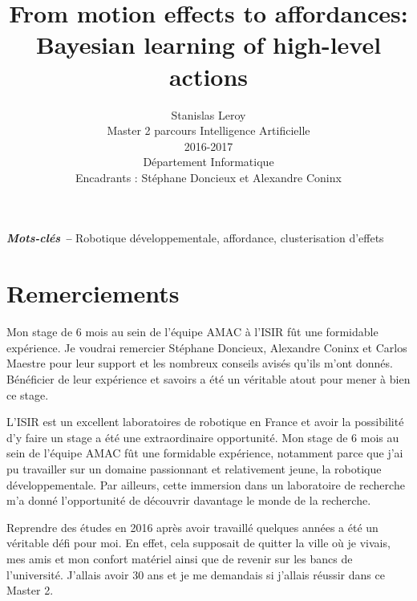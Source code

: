 \documentclass{llncs}
\providecommand{\keywords}[1]{\textbf{\textit{Mots-clés --}} #1}
\begin{document}
\title{From motion effects to affordances: Bayesian learning of high-level actions}

\author{Stanislas Leroy\\
   Master 2 parcours Intelligence Artificielle\\
   2016-2017\\
   Département Informatique\\
   Encadrants : Stéphane Doncieux et Alexandre Coninx}

\maketitle

\keywords{Robotique développementale, affordance, clusterisation d'effets}






\section*{Remerciements}

Mon stage de 6 mois au sein de l'équipe AMAC à l'ISIR fût une formidable expérience. Je voudrai remercier Stéphane Doncieux, Alexandre Coninx et Carlos Maestre pour leur support et les nombreux conseils avisés qu'ils m'ont donnés.
Bénéficier de leur expérience et savoirs a été un véritable atout pour mener à bien ce stage.

L'ISIR est un excellent laboratoires de robotique en France et avoir la possibilité d'y faire un stage a été une extraordinaire opportunité. Mon stage de 6 mois au sein de l'équipe AMAC fût une formidable expérience, notamment parce que j'ai pu travailler sur un domaine passionnant et relativement jeune, la robotique développementale. Par ailleurs,  cette immersion dans un laboratoire de recherche m'a donné l'opportunité de découvrir davantage le monde de la recherche.

Reprendre des études en 2016 après avoir travaillé quelques années a été un véritable défi pour moi. En effet, cela supposait de quitter la ville où je vivais, mes amis et mon confort matériel ainsi que de revenir sur les bancs de l'université. J'allais avoir 30 ans et je me demandais si j'allais réussir dans ce Master 2.
\end{document}
